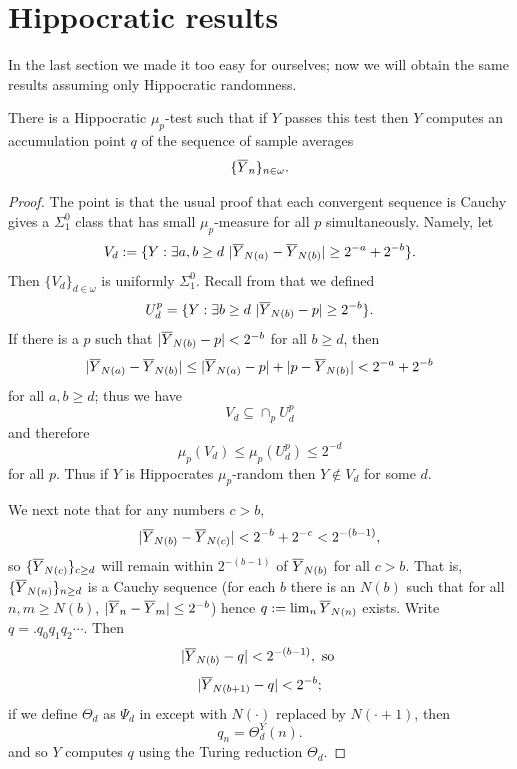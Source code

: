 \section{Hippocratic results}

In the last section we made it too easy for ourselves; now we will obtain the same results assuming only Hippocratic randomness. 

\begin{theorem}\label{accumulate}
There is a Hippocratic $\mu_p$-test such that if $Y$ passes this test then $Y$ computes an accumulation point $q$ of the sequence of sample averages 
\[
\{\overline Y_n\}_{n\in\omega}.
\] 
\end{theorem}

\begin{proof}
The point is that the usual proof that each convergent sequence is Cauchy gives a $\Sigma^0_1$ class that has small $\mu_p$-measure for all $p$ simultaneously. Namely, let
\[
V_d:=\{Y: \exists a,b\ge d\,\,|\overline Y_{N(a)}-\overline Y_{N(b)}|\ge 2^{-a}+ 2^{-b}\}.
\]
Then $\{V_d\}_{d\in\omega}$ is uniformly $\Sigma^0_1$. Recall from  that we defined
\[
U^{p}_d=\{Y:\exists b\ge d\,\, |\overline Y_{N(b)}-p|\ge 2^{-b}\}.
\]
If there is a $p$ such that $|\overline Y_{N(b)}-p|<2^{-b}$ for all $b\ge d$, then 
\[
|\overline Y_{N(a)}-\overline Y_{N(b)}|\le |\overline Y_{N(a)}-p|+|p-\overline Y_{N(b)}|< 2^{-a}+2^{-b}
\]
for all $a,b\ge d$; thus we have 
\[
V_d\subseteq \cap_{p} U^{p}_d
\]
and therefore 
\[
\mu_p(V_d)\le\mu_p(U^{p}_d)\le 2^{-d}
\]
for all $p$. 
 Thus if $Y$ is Hippocrates $\mu_p$-random then $Y\not\in V_d$ for some $d$. %

We next note that for any numbers $c> b$, 
\[
|\overline Y_{N(b)} - \overline Y_{N(c)}| < 2^{-b}+2^{-c} < 2^{-(b-1)},
\]
so $\{\overline Y_{N(c)}\}_{c\ge d}$ will remain within $2^{-(b-1)}$ of $\overline Y_{N(b)}$ for all $c>b$. That is, $\{\overline Y_{N(n)}\}_{n\ge d}$ is a Cauchy sequence (for each $b$ there is an $N(b)$ such that for all $n,m\ge N(b)$, $|\overline Y_n-\overline Y_m|\le 2^{-b}$) hence $q:=\lim_n \overline Y_{N(n)}$ exists. Write $q=.q_0q_1q_2\cdots$. Then
\[
|\overline Y_{N(b)}-q| <  2^{-(b-1)}, \text{ so }
\]
\[
|\overline Y_{N(b+1)}-q| <  2^{-b};
\]
if we define $\Theta_d$ as $\Psi_d$ in  except with $N(\cdot)$ replaced by $N(\cdot+1)$, then
\[
q_n = \Theta_d^Y(n).
\] 
and so $Y$ computes $q$ using the Turing reduction $\Theta_d$. 
\end{proof}


